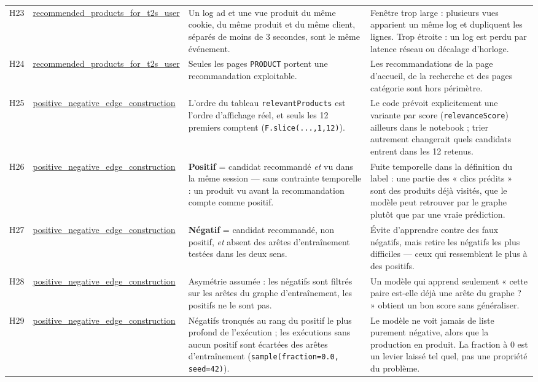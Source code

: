 \documentclass[11pt,a4paper]{article}
\newcommand{\code}[1]{\texttt{\small #1}}
\begin{document}
{\begin{longtable}{@{}l p{2.45cm} p{5.9cm} p{4.5cm}@{}}
\addlinespace
H23 & \url{recommended_products_for_t2s_user} & Un log ad et une vue produit du même cookie, du même produit et du même client, séparés de moins de 3 secondes, sont le même événement. & Fenêtre trop large : plusieurs vues apparient un même log et dupliquent les lignes. Trop étroite : un log est perdu par latence réseau ou décalage d'horloge. \\
\addlinespace
H24 & \url{recommended_products_for_t2s_user} & Seules les pages \code{PRODUCT} portent une recommandation exploitable. & Les recommandations de la page d'accueil, de la recherche et des pages catégorie sont hors périmètre. \\
\addlinespace
H25 & \url{positive_negative_edge_construction} & L'ordre du tableau \code{relevantProducts} est l'ordre d'affichage réel, et seuls les 12 premiers comptent (\code{F.slice(...,1,12)}). & Le code prévoit explicitement une variante par score (\code{relevanceScore}) ailleurs dans le notebook ; trier autrement changerait quels candidats entrent dans les 12 retenus. \\
\addlinespace
H26 & \url{positive_negative_edge_construction} & \textbf{Positif} = candidat recommandé \emph{et} vu dans la même session --- sans contrainte temporelle : un produit vu avant la recommandation compte comme positif. & Fuite temporelle dans la définition du label : une partie des « clics prédits » sont des produits déjà visités, que le modèle peut retrouver par le graphe plutôt que par une vraie prédiction. \\
\addlinespace
H27 & \url{positive_negative_edge_construction} & \textbf{Négatif} = candidat recommandé, non positif, \emph{et} absent des arêtes d'entraînement testées dans les deux sens. & Évite d'apprendre contre des faux négatifs, mais retire les négatifs les plus difficiles --- ceux qui ressemblent le plus à des positifs. \\
\addlinespace
H28 & \url{positive_negative_edge_construction} & Asymétrie assumée : les négatifs sont filtrés sur les arêtes du graphe d'entraînement, les positifs ne le sont pas. & Un modèle qui apprend seulement « cette paire est-elle déjà une arête du graphe ? » obtient un bon score sans généraliser. \\
\addlinespace
H29 & \url{positive_negative_edge_construction} & Négatifs tronqués au rang du positif le plus profond de l'exécution ; les exécutions sans aucun positif sont écartées des arêtes d'entraînement (\code{sample(fraction=0.0, seed=42)}). & Le modèle ne voit jamais de liste purement négative, alors que la production en produit. La fraction à 0 est un levier laissé tel quel, pas une propriété du problème. \\

\end{longtable}}
\end{document}
